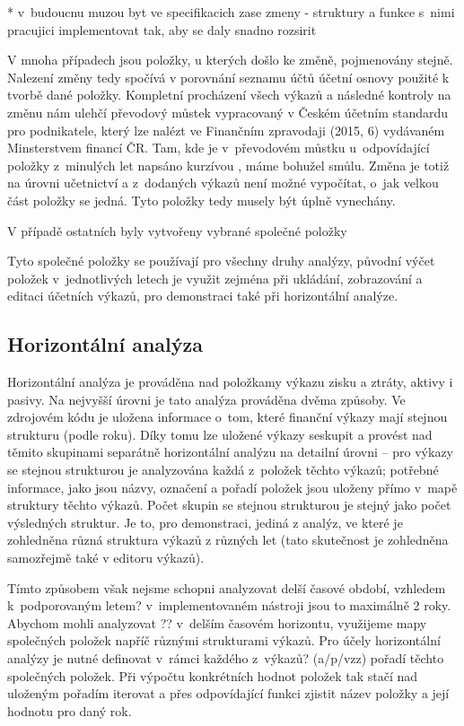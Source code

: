 * v~budoucnu muzou byt ve specifikacich zase zmeny - struktury a funkce s~nimi pracujici implementovat tak, aby se daly snadno rozsirit

V mnoha případech jsou položky, u kterých došlo ke změně, pojmenovány stejně. Nalezení změny tedy spočívá v porovnání seznamu účtů účetní osnovy použité k tvorbě dané položky. Kompletní procházení všech výkazů a následné kontroly na změnu nám ulehčí převodový můstek vypracovaný v Českém účetním standardu pro podnikatele, který lze nalézt ve Finančním zpravodaji (2015, 6) vydávaném Minsterstvem financí ČR. Tam, kde je v~převodovém můstku u~odpovídající položky z~minulých let napsáno kurzívou , máme bohužel smůlu. Změna je totiž na úrovni učetnictví a z~dodaných výkazů není možné vypočítat, o~jak velkou část položky se jedná. Tyto položky tedy musely být úplně vynechány.

V případě ostatních byly vytvořeny vybrané společné položky

Tyto společné položky se používají pro všechny druhy analýzy, původní výčet položek v~jednotlivých letech je využit zejména při ukládání, zobrazování a editaci účetních výkazů, pro demonstraci také při horizontální analýze.


\subsection{Horizontální analýza}
Horizontální analýza je prováděna nad položkamy výkazu zisku a ztráty, aktivy i pasivy. Na nejvyšší úrovni je tato analýza prováděna dvěma způsoby. Ve zdrojovém kódu je uložena informace o~tom, které finanční výkazy mají stejnou strukturu (podle roku). Díky tomu lze uložené výkazy seskupit a provést nad těmito skupinami separátně horizontální analýzu na detailní úrovni -- pro výkazy se stejnou strukturou je analyzována každá z~položek těchto výkazů; potřebné informace, jako jsou názvy, označení a pořadí položek jsou uloženy přímo v~mapě struktury těchto výkazů. Počet skupin se stejnou strukturou je stejný jako počet výsledných struktur. Je to, pro demonstraci, jediná z analýz, ve které je zohledněna různá struktura výkazů z různých let (tato skutečnost je zohledněna samozřejmě také v editoru výkazů).

Tímto způsobem však nejsme schopni analyzovat delší časové období, vzhledem k~podporovaným letem? v~implementovaném nástroji jsou to maximálně 2 roky. Abychom mohli analyzovat ?? v~delším časovém horizontu, využijeme mapy společných položek napříč různými strukturami výkazů. Pro účely horizontální analýzy je nutné definovat v~rámci každého z~výkazů? (a/p/vzz) pořadí těchto společných položek. Při výpočtu konkrétních hodnot položek tak stačí nad uloženým pořadím iterovat a přes odpovídající funkci zjistit název položky a její hodnotu pro daný rok.

